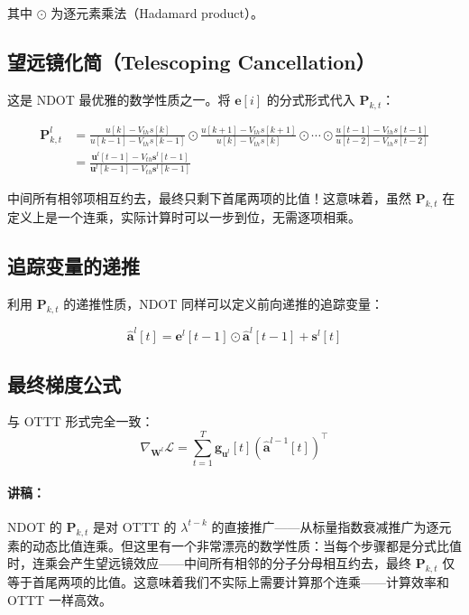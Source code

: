\documentclass[journal,12pt,onecolumn]{IEEEtran}
\begin{document}
其中 $\odot$ 为逐元素乘法（Hadamard product）。

\subsection*{望远镜化简（Telescoping Cancellation）}

这是 NDOT 最优雅的数学性质之一。将 $\mathbf{e}[i]$ 的分式形式代入 $\mathbf{P}_{k,t}$：

\begin{equation}
\begin{aligned}
\mathbf{P}_{k,t}^{l}
&=
\frac{u[k] - V_{th}s[k]}{u[k-1] - V_{th}s[k-1]}
\odot
\frac{u[k+1] - V_{th}s[k+1]}{u[k] - V_{th}s[k]}
\odot \cdots \odot
\frac{u[t-1] - V_{th}s[t-1]}{u[t-2] - V_{th}s[t-2]}
\\
&=
\frac{\mathbf{u}^{l}[t-1] - V_{th}\mathbf{s}^{l}[t-1]}
     {\mathbf{u}^{l}[k-1] - V_{th}\mathbf{s}^{l}[k-1]}
\end{aligned}
\label{eq.telescoping}
\end{equation}

中间所有相邻项相互约去，最终只剩下首尾两项的比值！这意味着，虽然 $\mathbf{P}_{k,t}$ 在定义上是一个连乘，实际计算时可以一步到位，无需逐项相乘。

\subsection*{追踪变量的递推}

利用 $\mathbf{P}_{k,t}$ 的递推性质，NDOT 同样可以定义前向递推的追踪变量：

\begin{equation}
\boxed{
\hat{\mathbf{a}}^{l}[t] = \mathbf{e}^{l}[t-1] \odot \hat{\mathbf{a}}^{l}[t-1] + \mathbf{s}^{l}[t]
}
\label{eq.ndot_recurrence}
\end{equation}

\subsection*{最终梯度公式}

与 OTTT 形式完全一致：
\begin{equation}
\boxed{
\nabla_{\mathbf{W}^l} \mathcal{L}
=
\sum_{t=1}^{T}
\mathbf{g}_{\mathbf{u}^l}[t]
\left(
\hat{\mathbf{a}}^{l-1}[t]
\right)^{\top}
}
\label{eq.ndot_final}
\end{equation}

\paragraph{讲稿：}
NDOT 的 $\mathbf{P}_{k,t}$ 是对 OTTT 的 $\lambda^{t-k}$ 的直接推广——从标量指数衰减推广为逐元素的动态比值连乘。但这里有一个非常漂亮的数学性质：当每个步骤都是分式比值时，连乘会产生望远镜效应——中间所有相邻的分子分母相互约去，最终 $\mathbf{P}_{k,t}$ 仅等于首尾两项的比值。这意味着我们不实际上需要计算那个连乘——计算效率和 OTTT 一样高效。
\end{document}
